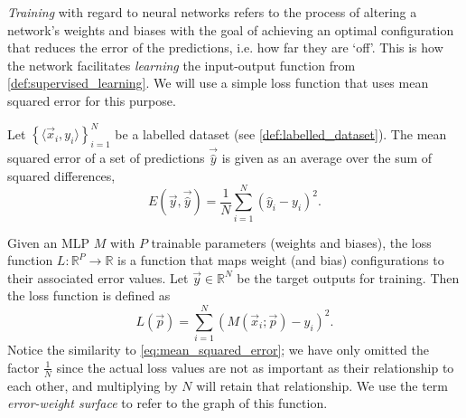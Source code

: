 \textit{Training} with regard to neural networks refers to the process of altering a network's weights and biases with the goal of achieving an optimal configuration that reduces the error of the predictions, i.e. how far they are `off'. 
This is how the network facilitates \textit{learning} the input-output function from \ref{def:supervised_learning}.
We will use a simple loss function that uses mean squared error for this purpose.
\begin{definition}
    \label{def:mean_squared_error}
    Let $\left\{\langle \vec{x}_i, y_i \rangle \right\}_{i=1}^N$ be a labelled dataset (see \ref{def:labelled_dataset}).
    The mean squared error of a set of predictions $\vec{\hat{y}}$ is given as an average over the sum of squared differences,
    \begin{equation}
        \label{eq:mean_squared_error}
        E\left( \vec{y}, \vec{\hat{y}} \right) = \frac{1}{N} \sum_{i=1}^N{\left(\hat{y}_i - y_i\right)^2}.
    \end{equation}
\end{definition}

\begin{definition}
    \label{def:loss_function}
    Given an MLP $M$ with $P$ trainable parameters (weights and biases), the loss function $L:\mathbb{R}^P\rightarrow \mathbb{R}$ is a function that maps weight (and bias) configurations to their associated error values.
    Let $\vec{y} \in \mathbb{R}^N$ be the target outputs for training.
    Then the loss function is defined as
    \begin{equation}
        \label{eq:loss_function}
        L(\vec{p}) = \sum_{i=1}^N{\left(M\left(\vec{x}_i; \vec{p}\right) - y_i\right)^2}.
    \end{equation}
    Notice the similarity to \ref{eq:mean_squared_error}; we have only omitted the factor $\frac{1}{N}$ since the actual loss values are not as important as their relationship to each other, and multiplying by $N$ will retain that relationship.
    We use the term \textit{error-weight surface} to refer to the graph of this function.
\end{definition}

